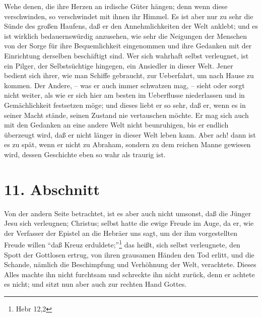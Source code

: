 Wehe denen, die ihre Herzen an irdische Güter hängen; denn wenn diese verschwinden, so verschwindet mit ihnen ihr Himmel. Es ist aber nur zu sehr die Sünde des großen Haufens, daß er den Annehmlichkeiten der Welt anklebt; und es ist wirklich bedauernswürdig anzusehen, wie sehr die Neigungen der Menschen von der Sorge für ihre Bequemlichkeit eingenommen und ihre Gedanken mit der Einrichtung derselben beschäftigt sind. Wer sich wahrhaft selbst verleugnet, ist ein Pilger, der Selbstsüchtige hingegen, ein Ansiedler in dieser Welt. Jener bedient sich ihrer, wie man Schiffe gebraucht, zur Ueberfahrt, um nach Hause zu kommen. Der Andere, -- was er auch immer schwatzen mag, -- sieht oder sorgt nicht weiter, als wie er sich hier am besten im Ueberflusse niederlassen und in Gemächlichkeit festsetzen möge; und dieses liebt er so sehr, daß er, wenn es in seiner Macht stände, seinen Zustand nie vertauschen möchte. Er mag sich auch mit den Gedanken an eine andere Welt nicht beunruhigen, bis er endlich überzeugt wird, daß er nicht länger in dieser Welt leben kann. Aber ach! dann ist es zu spät, wenn er nicht zu Abraham, sondern zu dem reichen Manne gewiesen wird, dessen Geschichte eben so wahr als traurig ist.

\section{11. Abschnitt}

Von der andern Seite betrachtet, ist es aber auch nicht umsonst, daß die Jünger Jesu sich verleugnen; Christus; selbst hatte die ewige Freude im Auge, da er, wie der Verfasser der Epistel an die Hebräer uns sagt, um der ihm vorgestellten Freude willen "`daß Kreuz erduldete;"'\footnote{Hebr 12,2} das heißt, sich selbst verleugnete, den Spott der Gottlosen ertrug, von ihren grausamen Händen den Tod erlitt, und die Schande, nämlich die Beschimpfung und Verhöhnung der Welt, verachtete. Dieses Alles machte ihn nicht furchtsam und schreckte ihn nicht zurück, denn er achtete es nicht; und sitzt nun aber auch zur rechten Hand Gottes.

